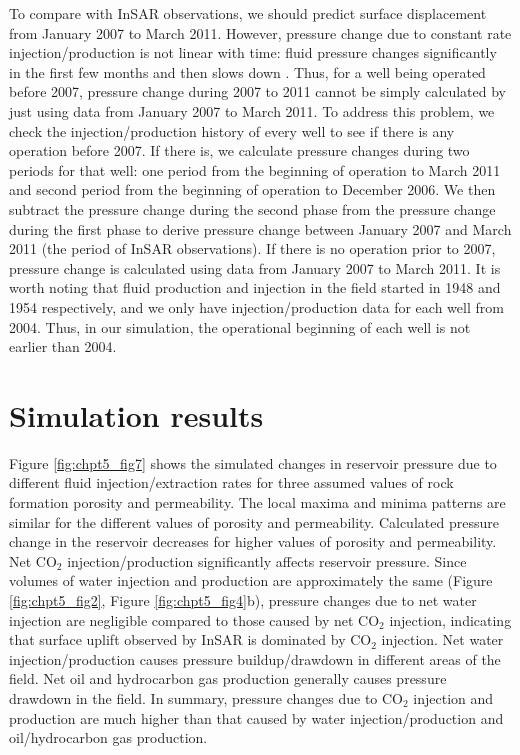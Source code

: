 To compare with InSAR observations, we should predict surface displacement from January 2007 to March 2011.  However, pressure change due to constant rate injection/production is not linear with time: fluid pressure changes significantly in the first few months and then slows down \cite[]{rohmer2012applicability}.  Thus, for a well being operated before 2007, pressure change during 2007 to 2011 cannot be simply calculated by just using data from January 2007 to March 2011.  To address this problem, we check the injection/production history of every well to see if there is any operation before 2007.  If there is, we calculate pressure changes during two periods for that well: one period from the beginning of operation to March 2011 and second period from the beginning of operation to December 2006. We then subtract the pressure change during the second phase from the pressure change during the first phase to derive pressure change between January 2007 and March 2011 (the period of InSAR observations).   If there is no operation prior to 2007, pressure change is calculated using data from January 2007 to March 2011.  It is worth noting that fluid production and injection in the field started in 1948 and 1954 respectively, and we only have injection/production data for each well from 2004. Thus, in our simulation, the operational beginning of each well is not earlier than 2004.  

\section{Simulation results}
Figure \ref{fig:chpt5_fig7} shows the simulated changes in reservoir pressure due to different fluid injection/extraction rates for three assumed values of rock formation porosity and permeability.  The local maxima and minima patterns are similar for the different values of porosity and permeability.  Calculated pressure change in the reservoir decreases for higher values of porosity and permeability.  Net CO$_{2}$ injection/production significantly affects reservoir pressure.  Since volumes of water injection and production are approximately the same (Figure \ref{fig:chpt5_fig2}, Figure \ref{fig:chpt5_fig4}b), pressure changes due to net water injection are negligible compared to those caused by net CO$_{2}$ injection, indicating that surface uplift observed by InSAR is dominated by CO$_{2}$ injection. Net water injection/production causes pressure buildup/drawdown in different areas of the field.  Net oil and hydrocarbon gas production generally causes pressure drawdown in the field.  In summary, pressure changes due to CO$_{2}$ injection and production are much higher than that caused by water injection/production and oil/hydrocarbon gas production.

